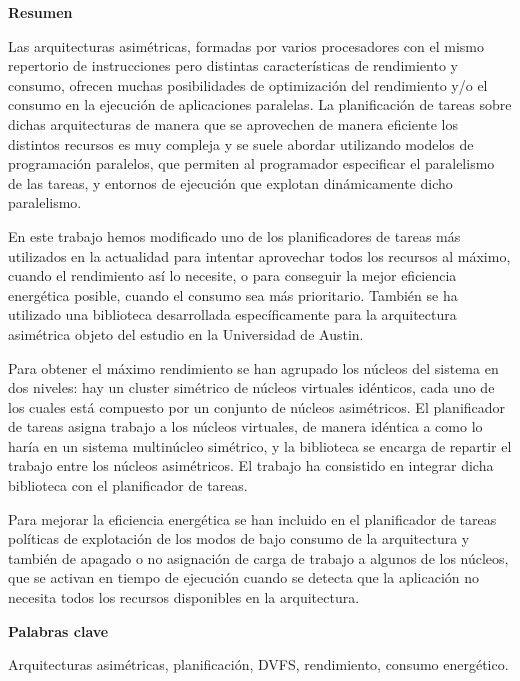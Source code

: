 
\cleardoublepage
\thispagestyle{empty}

\begin{center}
  {\bf \Huge Resumen}
\end{center}

Las arquitecturas asimétricas, formadas por varios procesadores con el
mismo repertorio de instrucciones pero distintas características de
rendimiento y consumo, ofrecen muchas posibilidades de optimización del
rendimiento y/o el consumo en la ejecución de aplicaciones paralelas. La
planificación de tareas sobre dichas arquitecturas de manera que se
aprovechen de manera eficiente los distintos recursos es muy compleja y se
suele abordar utilizando modelos de programación paralelos, que permiten al
programador especificar el paralelismo de las tareas, y entornos de
ejecución que explotan dinámicamente dicho paralelismo.

En este trabajo hemos modificado uno de los planificadores de tareas más
utilizados en la actualidad para intentar aprovechar todos los recursos al
máximo, cuando el rendimiento así lo necesite, o para conseguir la mejor
eficiencia energética posible, cuando el consumo sea más
prioritario. También se ha utilizado una biblioteca desarrollada
específicamente para la arquitectura asimétrica objeto del estudio en la
Universidad de Austin.

Para obtener el máximo rendimiento se han agrupado los núcleos del sistema
en dos niveles: hay un cluster simétrico de núcleos virtuales idénticos,
cada uno de los cuales está compuesto por un conjunto de núcleos
asimétricos. El planificador de tareas asigna trabajo a los núcleos
virtuales, de manera idéntica a como lo haría en un sistema multinúcleo
simétrico, y la biblioteca se encarga de repartir el trabajo entre los
núcleos asimétricos. El trabajo ha consistido en integrar dicha biblioteca
con el planificador de tareas.

Para mejorar la eficiencia energética se han incluido en el planificador de
tareas políticas de explotación de los modos de bajo consumo de la
arquitectura y también de apagado o no asignación de carga de trabajo a
algunos de los núcleos, que se activan en tiempo de ejecución cuando se
detecta que la aplicación no necesita todos los recursos disponibles en la
arquitectura.


\begin{center}
  {\bf \Large Palabras clave}
\end{center}
\vspace{0.5cm}
   
Arquitecturas asimétricas, planificación, DVFS, rendimiento, consumo
energético.



